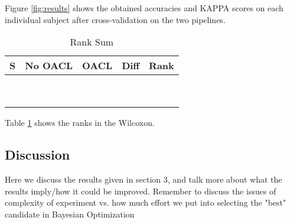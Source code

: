 Figure \ref{fig:results} shows the obtained accuracies and KAPPA scores on each individual subject after cross-validation on the two pipelines.
\begin{table}[H]
	\centering
	\caption{Rank Sum}
	\label{fig:wilcoxon}
	\begin{tabular}{@{}l|llll@{}}
		\toprule
		S & No OACL & OACL & Diff & Rank \\ \midrule
		&               &                 &      &      \\
		&               &                 &      &      \\
		&               &                 &      &      \\
		&               &                 &      &      \\
		&               &                 &      &      \\
		&               &                 &      &      \\
		&               &                 &      &      \\
		&               &                 &      &      \\
		&               &                 &      &      \\ \bottomrule
	\end{tabular}
\end{table}
Table \ref{fig:wilcoxon} shows the ranks in the Wilcoxon. 
\subsection{Discussion}
Here we discuss the results given in section 3, and talk more about what the results imply/how it could be improved.
Remember to discuss the issues of complexity of experiment vs. how much effort we put into selecting the "best" candidate in Bayesian Optimization